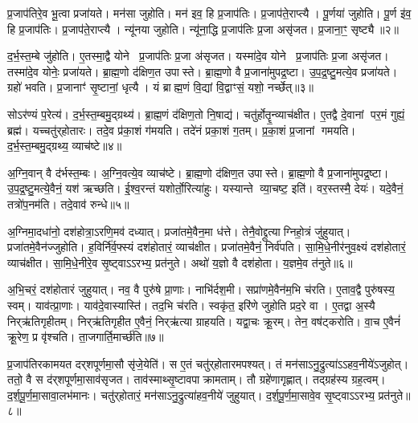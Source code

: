 प्र॒जाप॑तिरे॒व भू॒त्वा प्रजा॑यते।
मन॑सा जुहोति।
मन॑ इव॒ हि प्र॒जाप॑तिः।
प्र॒जाप॑ते॒राप्त्यै।
पू॒र्णया॑ जुहोति।
पू॒र्ण इ॑व॒ हि प्र॒जाप॑तिः।
प्र॒जाप॑ते॒राप्त्यै।
न्यू॑नया जुहोति।
न्यू॑ना॒द्धि प्र॒जाप॑तिः प्र॒जा असृ॑जत।
प्र॒जाना॒ꣳ॒ सृष्ट्यै॥२॥

द॒र्भ॒स्त॒म्बे जु॑होति।
ए॒तस्मा॒द्वै योने प्र॒जाप॑तिः प्र॒जा अ॑सृजत।
यस्मा॑दे॒व योने प्र॒जाप॑तिः प्र॒जा असृ॑जत।
तस्मा॑दे॒व योनेः॒ प्रजा॑यते।
ब्रा॒ह्म॒णो द॑क्षिण॒त उपास्ते।
ब्रा॒ह्म॒णो वै प्र॒जाना॑मुपद्र॒ष्टा।
उ॒प॒द्र॒ष्टु॒मत्ये॒व प्रजा॑यते।
ग्रहो॑ भवति।
प्र॒जानाꣳ॑ सृ॒ष्टानां॒ धृत्यै।
यं ब्राह्म॒णं वि॒द्यां वि॒द्वाꣳसं॒ यशो॒ नर्च्छेत्॥३॥

सोऽर॑ण्यं प॒रेत्य॑।
द॒र्भ॒स्त॒म्बमु॒द्ग्रथ्य॑।
ब्रा॒ह्म॒णं द॑क्षिण॒तो नि॒षाद्य॑।
चतु॑र्\mbox{}होतॄ॒न्व्याच॑क्षीत।
ए॒तद्वै दे॒वानां पर॒मं गुह्यं॒ ब्रह्म॑।
यच्चतु॑र्‌\mbox{}होतारः।
तदे॒व प्र॑का॒शं ग॑मयति।
तदे॑नं प्रका॒शं ग॒तम्।
प्र॒का॒शं प्र॒जानां गमयति।
द॒र्भ॒स्त॒म्बमु॒द्ग्रथ्य॒ व्याच॑ष्टे॥४॥

अ॒ग्नि॒वान् वै द॑र्भस्त॒म्बः।
अ॒ग्नि॒वत्ये॒व व्याच॑ष्टे।
ब्रा॒ह्म॒णो द॑क्षिण॒त उपास्ते।
ब्रा॒ह्म॒णो वै प्र॒जाना॑मुपद्र॒ष्टा।
उ॒प॒द्र॒ष्टु॒मत्ये॒वैनं॒ यश॑ ऋच्छति।
ई॒श्व॒रन्तं यशोर्तो॒रित्या॑हुः।
यस्यान्ते व्या॒चष्ट॒ इति॑।
वर॒स्तस्मै॒ देयः॑।
यदे॒वैनं॒ तत्रो॑प॒नम॑ति।
तदे॒वाव॑ रुन्धे॥५॥

अ॒ग्निमा॒दधा॑नो॒ दश॑होत्रा॒\-ऽरणि॒मव॑ दध्यात्।
प्रजा॑तमे॒वैन॒मा ध॑त्ते।
तेनै॒वोद्द्रुत्याग्निहो॒त्रं जु॑हुयात्।
प्रजा॑तमे॒वैन॑ज्जुहोति।
ह॒विर्नि॑र्व॒फ्स्यं दश॑होतारं॒ व्याच॑क्षीत।
प्रजा॑तमे॒वैनं॒ निर्व॑पति।
सा॒मि॒धे॒नीर॑नुव॒क्ष्यं दश॑होतारं॒ व्याच॑क्षीत।
सा॒मि॒धे॒नीरे॒व सृ॒ष्ट्वा\-ऽऽरभ्य॒ प्रत॑नुते।
अथो॑ य॒ज्ञो वै दश॑होता।
य॒ज्ञमे॒व त॑नुते॥६॥

अ॒भि॒चरं॒ दश॑होतारं जुहुयात्।
नव॒ वै पुरु॑षे प्रा॒णाः।
नाभि॑र्दश॒मी।
सप्रा॑णमे॒वैन॑म॒भि च॑रति।
ए॒ताव॒द्वै पुरु॑षस्य॒ स्वम्।
याव॑त्प्रा॒णाः।
याव॑दे॒वास्यास्ति॑।
तद॒भि च॑रति।
स्वकृ॑त॒ इरि॑णे जुहोति प्रद॒रे वा।
ए॒तद्वा अ॒स्यै निर्‌\mbox{}ऋ॑तिगृहीतम्।
निर्‌\mbox{}ऋ॑तिगृहीत ए॒वैनं॒ निर्‌\mbox{}ऋ॑त्या ग्राहयति।
यद्वा॒चः क्रू॒रम्।
तेन॒ वष॑ट्करोति।
वा॒च ए॒वैनं॑ क्रू॒रेण॒ प्र वृ॑श्चति।
ता॒जगार्ति॒मार्च्छ॑ति॥७॥\anuvakamend[दश॑होता॒ सृष्ट्या॑ ऋ॒च्छेद्व्याच॑प्टे रुन्ध ए॒व त॑नुते॒ निर्‌\mbox{}ऋ॑तिगृहीतं॒ पञ्च॑ च]

प्र॒जाप॑तिरकामयत दर्‌\mbox{}शपूर्णमा॒सौ सृ॑जे॒येति॑।
स ए॒तं  चतु॑र्‌\mbox{}होतारमपश्यत्।
तं मन॑सा\-ऽनु॒द्रुत्या॑\-ऽऽहव॒नीये॑\-ऽजुहोत्।
ततो॒ वै स द॑र्‌\mbox{}शपूर्णमा॒साव॑सृजत।
ताव॑स्माथ्सृ॒ष्टावपा\-क्रामताम्।
तौ ग्रहे॑णागृह्णात्।
तद्ग्रह॑स्य ग्रह॒त्वम्।
द॒र्श॒पू॒र्ण॒मा॒सावा॒लभ॑मानः।
चतु॑र्‌\mbox{}होतारं॒ मन॑सा\-ऽनु॒द्रुत्या॑\-हव॒नीये॑ जुहुयात्।
द॒र्श॒पू॒र्ण॒मा॒सावे॒व सृ॒ष्ट्वा\-ऽऽरभ्य॒ प्रत॑नुते॥८॥

